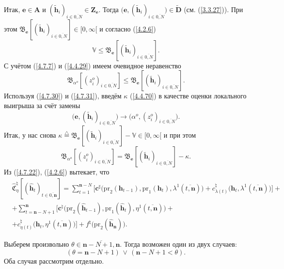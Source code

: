 \documentclass[11pt,twoside]{report}
\newcommand{\bfn}{\begin{equation}}
\newcommand{\efn}{\end{equation}}
\newcommand{\df}{\stackrel{\triangle}{=}}
\newcommand{\ov}{\overline}
\newcommand{\la}{\lambda}
\newcommand{\al}{\alpha}
\newcommand{\bbv}{{\mathbb V}}
\newcommand{\zc}{{\mathbf c}}
\newcommand{\nn}{{\mathbf n}}
\begin{document}
{{Итак, $\mathbf{e}\in \mathbf{A}$ и $(\tilde{\mathbf{h}}_i)_{i\in\ov{0,N}}\in
\mathbf{Z}_\mathbf{e}.$ Тогда $\bigl(\mathbf{e},(\tilde{\mathbf{h}}_i)_{i\in\ov{0,N}}\bigl)\in
\widetilde{\mathbf{D}}$ (см.  (\ref{3.3.27})). При этом
$\mathfrak{B}_\mathbf{e}[(\tilde{\mathbf{h}}_i)_{i\in\ov{0,N}}]\in [0,\infty[$ и согласно (\ref{4.2.6})
\bfn\label{4.7.30}\bbv\leqslant \mathfrak{B}_\mathbf{e}[(\tilde{\mathbf{h}}_i)_{i\in\ov{0,N}}].
\efn
С учётом (\ref{4.7.7}) и (\ref{4.4.29}) имеем очевидное неравенство
\bfn\label{4.7.31}\mathfrak{B}_{\al^o}[(z_i^o)_{i\in\ov{0,N}}] \leqslant
\mathfrak{B}_\mathbf{e}[(\tilde{\mathbf{h}}_i)_{i\in\ov{0,N}}].
\efn
Используя (\ref{4.7.30}) и (\ref{4.7.31}), введём $\kappa$ (\ref{4.4.70}) в
качестве оценки локального выигрыша за счёт замены
$$\bigl(\mathbf{e},(\tilde{\mathbf{h}}_i)_{i\in\ov{0,N}}\bigl) \longrightarrow \bigl(\al^o,
(z_i^o)_{i\in\ov{0,N}}\bigl).
$$
Итак, у нас снова $\kappa \df \mathfrak{B}_\mathbf{e}[(\tilde{\mathbf{h}}_i)_{i\in\ov{0,N}}]-
\bbv \in [0,\infty[$  и при этом
\bfn\label{4.7.32}\mathfrak{B}_{\al^o}[(z_i^o)_{i\in\ov{0,N}}] =
\mathfrak{B}_\mathbf{e}[(\tilde{\mathbf{h}}_i)_{i\in\ov{0,N}}]- \kappa.
\efn
Из (\ref{4.7.22}), (\ref{4.2.6})
вытекает, что
\begin{eqnarray}
&\widehat{\mathfrak{C}}_\eta^\natural[(\hat{\mathbf{h}}_t)_{t\in\ov{0,\nn}}]=
\sum\limits_{t=1}^{\nn-N}\bigl[\zc^\sharp\bigl(\mathrm{pr}_2(\mathbf{h}_{t-1}),\mathrm{pr}_1
(\mathbf{h}_t),\la^1(\ov{t,\nn})\bigl) +c_{\la(t)}^\natural\bigl(\mathbf{h}_t,\la^1(\ov{t,\nn})\bigl)\bigl]+
&\nonumber\\
&+\sum\limits_{t=\nn-N+1}^\nn\bigl[\zc^\natural\bigl(\mathrm{pr}_2(\hat{\mathbf{h}}_{t-1}),
\mathrm{pr}_1(\hat{\mathbf{h}}_t),\eta^1(\ov{t,\nn})\bigl) +
&\nonumber\\
&+c_{\eta(t)}^\natural\bigl(\hat{\mathbf{h}}_t,\eta^1(\ov{t,\nn})\bigl)\bigl] +
f^\natural\bigl(\mathrm{pr}_2(\hat{\mathbf{h}}_\nn)\bigl).
&\label{4.7.33}
\end{eqnarray}

Выберем произвольно $\theta\in\ov{\nn-N+1,\nn}.$ Тогда возможен один из двух случаев:
\bfn\label{4.7.38}(\theta =\nn-N+1)\,\vee\,(\nn-N+1< \theta).
\efn
Оба случая рассмотрим отдельно.

}}
\end{document}
